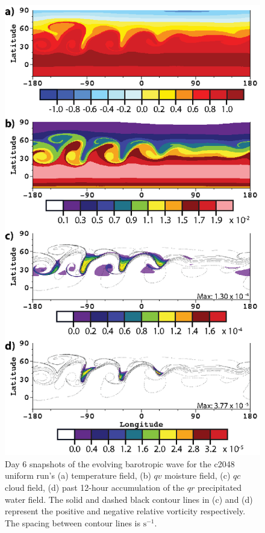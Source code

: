 \begin{figure}
   \centerline{%
   \noindent
   \includegraphics[width=\textwidth,height=\textheight,keepaspectratio]{Chap2/A_c2048_allvar-01}}
   \caption{Day 6 snapshots of the evolving barotropic wave for the c2048 uniform 
   run's (a) temperature field, (b) $qv$ moisture field, (c) $qc$ cloud field, (d) past 12-hour 
   accumulation of the $qr$ precipitated water field. The solid and dashed black contour
   lines in (c) and (d) represent the positive and negative relative vorticity respectively.
   The spacing between contour lines is $ \mathrm{s}^{-1}$.
   }
   \label{fig:c2048allvar}
\end{figure}

